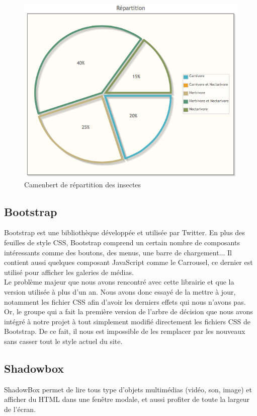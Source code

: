 \documentclass[twoside]{EPURapport}
\begin{document}
		\begin{figure}[hbtp]
			\centering
			\includegraphics[scale=0.5]{images/lib-jqplot.png}
			\caption{Camenbert de répartition des insectes}
		\end{figure}
		
		
		\subsection{Bootstrap}
		\label{lib:bootstrap}
		Bootstrap est une bibliothèque développée et utilisée par Twitter. En plus des feuilles de style CSS, Bootstrap comprend un certain nombre de composants intéressants comme des boutons, des menus, une barre de chargement... Il contient aussi quelques composant JavaScript comme le Carrousel, ce dernier est utilisé pour  afficher les galeries de médias.\\
		
		Le problème majeur que nous avons rencontré avec cette librairie et que la version utilisée à plus d'un an. Nous avons donc essayé de la mettre à jour, notamment les fichier CSS afin d'avoir les derniers effets qui nous n'avons pas. Or, le groupe qui a fait la première version de l'arbre de décision que nous avons intégré à notre projet à tout simplement modifié directement les fichiers CSS de Bootstrap. De ce fait, il nous est impossible de les remplacer par les nouveaux sans casser tout le style actuel du site.
		
		\subsection{Shadowbox}
		\label{lib:shadowbox}
		ShadowBox permet de lire tous type d'objets multimédias (vidéo, son, image) et afficher du HTML dans une fenêtre modale, et aussi profiter de toute la largeur de l'écran.
		
\end{document}
